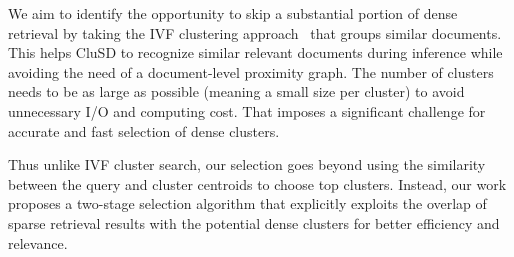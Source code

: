 We aim to identify the opportunity to skip a substantial portion of dense retrieval 
by taking the IVF clustering approach~\cite{johnson2019billion} that  groups similar documents. 
This  helps CluSD to recognize similar relevant documents during inference while avoiding the 
need of a document-level proximity graph. The number of clusters needs to be as large as possible (meaning a small size per cluster) to avoid unnecessary I/O and computing cost. That imposes a significant challenge for accurate and fast selection of dense clusters.

Thus unlike IVF cluster search, our selection goes beyond using the similarity between the query and cluster centroids to 
choose top clusters.  Instead, our work proposes a two-stage selection algorithm that explicitly exploits the overlap of sparse retrieval results with the potential dense clusters for better efficiency and relevance.   



